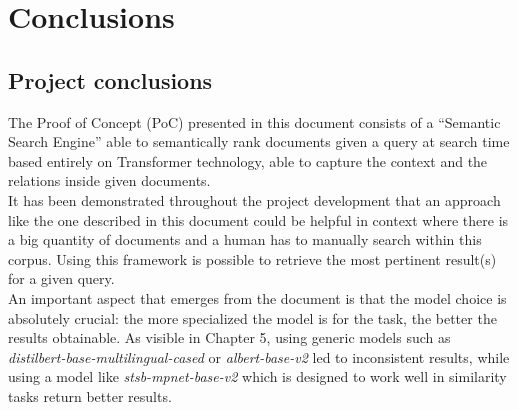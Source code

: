 \documentclass[\main/main.tex]{subfiles}
\begin{document}
\chapter{Conclusions}
\section{Project conclusions}
The Proof of Concept (PoC) presented in this document consists of a ``Semantic Search Engine'' able to semantically rank documents given a query at search time based entirely on Transformer technology, able to capture the context and the relations inside given documents. \\
It has been demonstrated throughout the project development that an approach like the one described in this document could be helpful in context where there is a big quantity of documents and a human has to manually search within this corpus. Using this framework is possible to retrieve the most pertinent result(s) for a given query. \\
An important aspect that emerges from the document is that the model choice is absolutely crucial: the more specialized the model is for the task, the better the results obtainable. As visible in Chapter 5, using generic models such as \emph{distilbert-base-multilingual-cased} or \emph{albert-base-v2} led to inconsistent results, while using a model like \emph{stsb-mpnet-base-v2} which is designed to work well in similarity tasks return better results.
\end{document}

